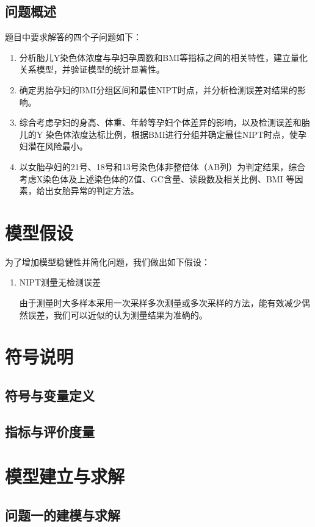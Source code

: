 \documentclass[withoutpreface]{cumcmthesis}
\begin{document}
\subsection{问题概述}
题目中要求解答的四个子问题如下：

\begin{enumerate}
    \item 分析胎儿Y染色体浓度与孕妇孕周数和BMI等指标之间的相关特性，建立量化关系模型，并验证模型的统计显著性。
    \item 确定男胎孕妇的BMI分组区间和最佳NIPT时点，并分析检测误差对结果的影响。
    \item 综合考虑孕妇的身高、体重、年龄等孕妇个体差异的影响，以及检测误差和胎儿的Y 染色体浓度达标比例，根据BMI进行分组并确定最佳NIPT时点，使孕妇潜在风险最小。
    \item 以女胎孕妇的21号、18号和13号染色体非整倍体（AB列）为判定结果，综合考虑X染色体及上述染色体的Z值、GC含量、读段数及相关比例、BMI 等因素，给出女胎异常的判定方法。
\end{enumerate}

\section{模型假设}
为了增加模型稳健性并简化问题，我们做出如下假设：
\begin{enumerate}
    \item NIPT测量无检测误差
    
    由于测量时大多样本采用一次采样多次测量或多次采样的方法，能有效减少偶然误差，我们可以近似的认为测量结果为准确的。
\end{enumerate}

\section{符号说明}
\subsection{符号与变量定义}
\subsection{指标与评价度量}

\section{模型建立与求解}

\subsection{问题一的建模与求解}
\end{document}
